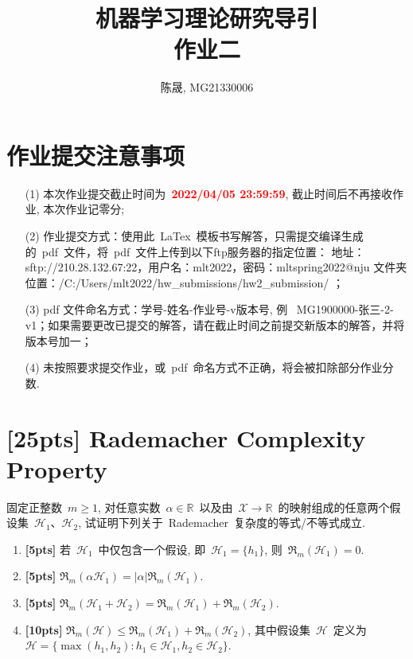 \documentclass[a4paper,UTF8]{article}
\numberwithin{equation}{section}
\begin{document}
\title{机器学习理论研究导引\\
作业二}
\author{陈晟, MG21330006} 
\maketitle

\section*{作业提交注意事项}

\begin{tcolorbox}
    \begin{enumerate}
        \item[(1)] 本次作业提交截止时间为~\textcolor{red}{\textbf{2022/04/05  23:59:59}}, 截止时间后不再接收作业, 本次作业记零分; 
        \item[(2)] 作业提交方式：使用此~LaTex~模板书写解答，只需提交编译生成的~pdf~文件，将~pdf~文件上传到以下ftp服务器的指定位置：
        \newline 地址：sftp://210.28.132.67:22，用户名：mlt2022，密码：mltspring2022@nju
        \newline 文件夹位置：/C:/Users/mlt2022/hw\_submissions/hw2\_submission/  ；
        \item[(3)] pdf 文件命名方式：学号-姓名-作业号-v版本号, 例~ MG1900000-张三-2-v1；如果需要更改已提交的解答，请在截止时间之前提交新版本的解答，并将版本号加一；
        \item[(4)] 未按照要求提交作业，或~pdf~命名方式不正确，将会被扣除部分作业分数. 
    \end{enumerate}
\end{tcolorbox}

\newpage

\section{[25pts] Rademacher Complexity Property}

\noindent 固定正整数~$m\geqslant 1$, 对任意实数~$\alpha\in \mathbb{R}$~以及由~$\mathcal{X} \rightarrow \mathbb{R}$~的映射组成的任意两个假设集~$\mathcal{H}_1$、$\mathcal{H}_2$, 试证明下列关于~Rademacher~复杂度的等式/不等式成立. 
\begin{enumerate}[(1)]
    \item \textbf{[5pts]} 若~$\mathcal{H}_1$~中仅包含一个假设, 即~$\mathcal{H}_1=\{h_1\}$,  则~$\mathfrak{R}_m(\mathcal{H}_1) = 0$.
    \item \textbf{[5pts]} $\mathfrak{R}_m(\alpha \mathcal{H}_1) = |\alpha|\mathfrak{R}_m(\mathcal{H}_1)$.
    \item \textbf{[5pts]} $\mathfrak{R}_m(\mathcal{H}_1 + \mathcal{H}_2) = \mathfrak{R}_m(\mathcal{H}_1) + \mathfrak{R}_m(\mathcal{H}_2)$.
    \item \textbf{[10pts]} $\mathfrak{R}_m(\mathcal{H}) \leqslant \mathfrak{R}_m(\mathcal{H}_1) + \mathfrak{R}_m(\mathcal{H}_2)$, 其中假设集~$\mathcal{H}$~定义为~$\mathcal{H} = \{\max(h_1,h_2): h_1\in \mathcal{H}_1, h_2\in \mathcal{H}_2\}$.
\end{enumerate}
\end{document}
